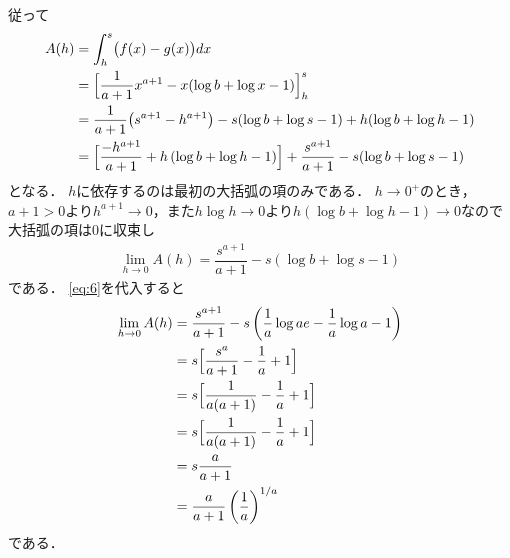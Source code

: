 \documentclass[../../main.tex]{subfiles}
\begin{document}
従って
\begin{align}
  A(h)
  &=\int_h^s\bigl(f(x)-g(x)\bigr)dx \\
  &=\Bigl[\dfrac{1}{a+1}x^{a+1}-x(\log b+\log x-1)\Bigr]_h^s \\
  &=\dfrac{1}{a+1}\bigl(s^{a+1}-h^{a+1}\bigr)-s(\log b+\log s-1)+h(\log b+\log h-1) \\
  &=\Bigl[\dfrac{-h^{a+1}}{a+1}+h\left(\log b + \log h -1\right)\Bigr] + \dfrac{s^{a+1}}{a+1} - s(\log b+\log s-1) \label{eq:7}
\end{align}
となる．
$h$に依存するのは最初の大括弧の項のみである．
$h\to0^+$のとき，$a+1>0$より$h^{a+1}\to0$，また$h\log h\to0$より$h(\log b+\log h-1)\to0$なので大括弧の項は$0$に収束し
\begin{align}
  \lim_{h\to0}A(h)=\dfrac{s^{a+1}}{a+1}-s(\log b+\log s-1) \label{eq:8}
\end{align}
である．
\cref{eq:6}を代入すると
\begin{align}
  \lim_{h\to0}A(h)
  &= \dfrac{s^{a+1}}{a+1} - s\left(\dfrac{1}{a}\log ae - \dfrac{1}{a}\log a -1\right) \\
  &= s \Bigl[\dfrac{s^{a}}{a+1} - \dfrac{1}{a} + 1 \Bigr] \\
  &= s \Bigl[\dfrac{1}{a(a+1)} - \dfrac{1}{a} + 1 \Bigr] \\
  &= s \Bigl[\dfrac{1}{a(a+1)} - \dfrac{1}{a} + 1 \Bigr] \\
  &= s \dfrac{a}{a+1} \\
  &= \dfrac{a}{a+1} \left(\dfrac{1}{a}\right)^{1/a}
\end{align}
である．

\newpage
\end{document}
